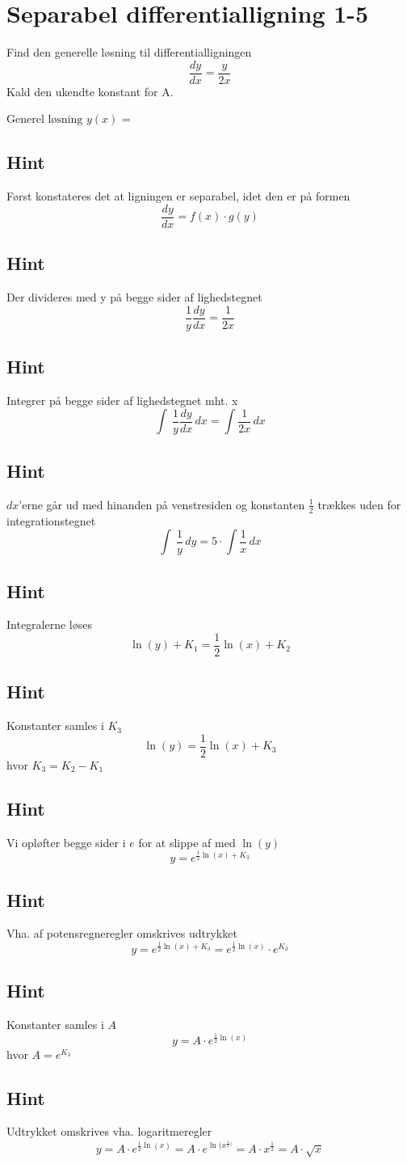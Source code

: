 \documentclass{article}
\newenvironment{exercise}[1]{\newpage\section{#1}}{}
\newcommand{\answerbox}[1]{\fbox{$#1$}}
\newcommand{\hint}{\subsection*{Hint}}
\begin{document}
\begin{exercise}{Separabel differentialligning 1-5}
	
	
	Find den generelle løsning til differentialligningen 
	\[
	\frac{dy}{dx} = \frac{y}{2x}
	\]
	Kald den ukendte konstant for A.
	
	$\textrm{Generel løsning } y(x)$ = \answerbox{A \cdot \sqrt{x}}
	
	\hint
	
	Først konstateres det at ligningen er separabel, idet den er på formen
	\[
	\frac{dy}{dx} = f(x) \cdot g(y)
	\]
	
	\hint 
	Der divideres med y på begge sider af lighedstegnet
	\[
	\frac{1}{y} \frac{dy}{dx} = \frac{1}{2x}
	\]
	
	\hint
	
	Integrer på begge sider af lighedstegnet mht. x
	\[
	\int\ \frac{1}{y} \frac{dy}{dx} \, dx= \int \frac{1}{2x} \,dx
	\]
	
	\hint
	
	$dx$'erne går ud med hinanden på venstresiden og konstanten $\frac{1}{2}$ trækkes uden for integrationstegnet
	\[
	\int\ \frac{1}{y}\, dy= 5 \cdot \int \frac{1}{x}\,dx
	\]
	
	\hint
	
	Integralerne løses
	\[
	\ln(y) + K_1 =\frac{1}{2} \ln(x) + K_2
	\]
	
	
	\hint
	
	Konstanter samles i $K_3$
	\[
	\ln(y) =\frac{1}{2} \ln(x) + K_3
	\]
	hvor $K_3=K_2-K_1$
	
	\hint 
	
	Vi opløfter begge sider i $e$ for at slippe af med $\ln(y)$
	\[
	y = e^{\frac{1}{2} \ln(x) + K_3}
	\]
	
	\hint
	
	Vha.  af potensregneregler omskrives udtrykket
	\[
	y = e^{\frac{1}{2} \ln(x) + K_3} = e^{\frac{1}{2} \ln(x)}  \cdot e^{K_3}
	\]
	
	\hint
	
	Konstanter samles i $A$
	\[
	y = A \cdot e^{\frac{1}{2} \ln(x)}
	\]
	hvor $ A= e^{K_3}$
	
	\hint 
	
	Udtrykket omskrives vha. logaritmeregler
	\[
	y = A \cdot e^{\frac{1}{2} \ln(x)} = A \cdot e^{\ln(x^{\frac{1}{2})}} = A \cdot x^{\frac{1}{2}} = A \cdot \sqrt{x}
	\]
	
\end{exercise}
\end{document}

